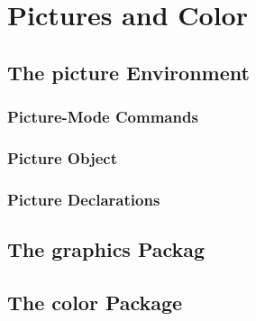 \section{Pictures and Color}
\subsection{The picture Environment}
\subsubsection{Picture-Mode Commands}
\subsubsection{Picture Object}
\subsubsection{Picture Declarations}


\subsection{The graphics Packag}


\subsection{The color Package}
\newpage